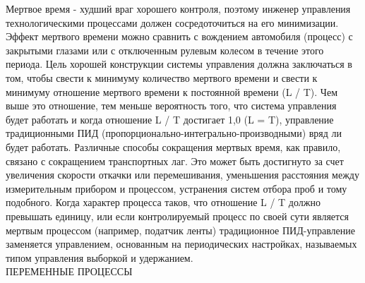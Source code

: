 \documentclass[aps,
12pt,
final,
oneside,
onecolumn,
musixtex, 
superscriptaddress,
centertags]{article}
\begin{document}
Мертвое время - худший враг хорошего контроля, поэтому инженер управления технологическими процессами должен сосредоточиться на его минимизации. Эффект мертвого времени можно сравнить с вождением автомобиля (процесс) с закрытыми глазами или с отключенным рулевым колесом в течение этого периода. Цель хорошей конструкции системы управления должна заключаться в том, чтобы свести к минимуму количество мертвого времени и свести к минимуму отношение мертвого времени к постоянной времени (L / T). Чем выше это отношение, тем меньше вероятность того, что система управления будет работать
и когда отношение L / T достигает 1,0 (L = T), управление традиционными ПИД (пропорционально-интегрально-производными) вряд ли будет работать. Различные способы сокращения мертвых время, как правило, связано с сокращением транспортных лаг. Это может быть достигнуто за счет увеличения скорости откачки или перемешивания, уменьшения расстояния между измерительным прибором и процессом, устранения систем отбора проб и тому подобного. Когда характер процесса таков, что отношение L / T должно превышать единицу, или если контролируемый процесс по своей сути является мертвым процессом (например, податчик ленты)
традиционное ПИД-управление заменяется управлением, основанным на периодических настройках, называемых типом управления выборкой и удержанием.\\

ПЕРЕМЕННЫЕ ПРОЦЕССЫ\\
\end{document}
